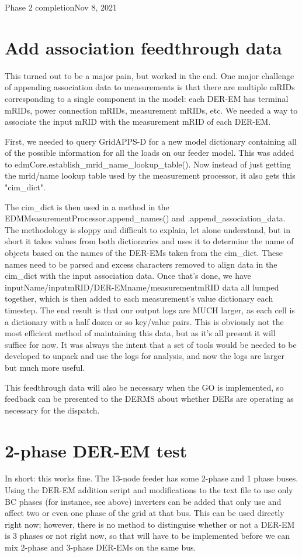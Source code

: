 \begin{entry}{Phase 2 completion}{Nov 8, 2021}
    \section*{Add association feedthrough data}
    This turned out to be a major pain, but worked in the end. One major challenge of appending association data to
    measurements is that there are multiple mRIDs corresponding to a single component in the model: each DER-EM has
    terminal mRIDs, power connection mRIDs, measurement mRIDs, etc. We needed a way to associate the input mRID with
    the measurement mRID of each DER-EM.

    First, we needed to query GridAPPS-D for a new model dictionary containing all of the possible information for all
    the loads on our feeder model. This was added to edmCore.establish_mrid_name_lookup_table(). Now instead of just
    getting the mrid/name lookup table used by the measurement processor, it also gets this "cim_dict".

    The cim_dict is then used in a method in the EDMMeasurementProcessor.append_names() and .append_association_data.
    The methodology is sloppy and difficult to explain, let alone understand, but in short it takes values from both
    dictionaries and uses it to determine the name of objects based on the names of the DER-EMs taken from the cim_dict.
    These names need to be parsed and excess characters removed to align data in the cim_dict with the input association
    data. Once that's done, we have inputName/inputmRID/DER-EMname/measurementmRID data all lumped together, which
    is then added to each measurement's value dictionary each timestep. The end result is that our output logs are MUCH
    larger, as each cell is a dictionary with a half dozen or so key/value pairs. This is obviously not the most
    efficient method of maintaining this data, but as it's all present it will suffice for now. It was always the intent
    that a set of tools would be needed to be developed to unpack and use the logs for analysis, and now the logs
    are larger but much more useful.

    This feedthrough data will also be necessary when the GO is implemented, so feedback can be presented to the DERMS
    about whether DERs are operating as necessary for the dispatch.

    \section*{2-phase DER-EM test}
    In short: this works fine. The 13-node feeder has some 2-phase and 1 phase buses. Using the DER-EM addition script
    and modifications to the text file to use only BC phases (for instance, see above) inverters can be added that only
    use and affect two or even one phase of the grid at that bus. This can be used directly right now; however, there
    is no method to distinguise whether or not a DER-EM is 3 phases or not right now, so that will have to be
    implemented before we can mix 2-phase and 3-phase DER-EMs on the same bus.


\end{entry}

